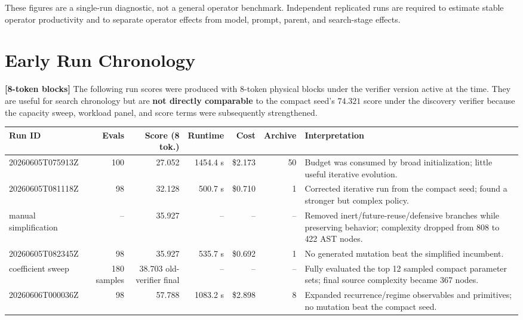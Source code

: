 \documentclass[11pt]{article}
\newcommand{\risk}[1]{\textbf{\color{red}#1}}
\newcommand{\blocktag}[1]{\textbf{\color{navy}[#1-token blocks]}}
\begin{document}
These figures are a single-run diagnostic, not a general operator benchmark.
Independent replicated runs are required to estimate stable operator productivity and
to separate operator effects from model, prompt, parent, and search-stage effects.

\section{Early Run Chronology}

\blocktag{8} The following run scores were produced with 8-token physical blocks under
the verifier version active at the time.  They are useful for search chronology but
are \risk{not directly comparable} to the
compact seed's \(74.321\) score under the discovery verifier because the capacity sweep,
workload panel, and score terms were subsequently strengthened.

\begin{center}
\scriptsize
\begin{tabularx}{\textwidth}{@{}lrrrrrX@{}}
\toprule
\textbf{Run ID} & \textbf{Evals} & \textbf{Score (8 tok.)} & \textbf{Runtime} &
\textbf{Cost} & \textbf{Archive} & \textbf{Interpretation} \\
\midrule
20260605T075913Z & 100 & 27.052 & 1454.4 s & \$2.173 & 50 &
Budget was consumed by broad initialization; little useful iterative evolution. \\
20260605T081118Z & 98 & 32.128 & 500.7 s & \$0.710 & 1 &
Corrected iterative run from the compact seed; found a stronger but complex policy. \\
manual simplification & -- & 35.927 & -- & -- & -- &
Removed inert/future-reuse/defensive branches while preserving behavior; complexity
dropped from 808 to 422 AST nodes. \\
20260605T082345Z & 98 & 35.927 & 535.7 s & \$0.692 & 1 &
No generated mutation beat the simplified incumbent. \\
coefficient sweep & 180 samples & 38.703 old-verifier final & -- & -- & -- &
Fully evaluated the top 12 sampled compact parameter sets; final source complexity
became 367 nodes. \\
20260606T000036Z & 98 & 57.788 & 1083.2 s & \$2.898 & 8 &
Expanded recurrence/regime observables and primitives; no mutation beat the compact
seed. \\
\bottomrule
\end{tabularx}
\end{center}
\end{document}
